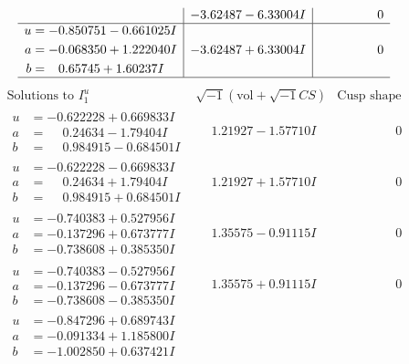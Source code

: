\documentclass[1p]{elsarticle_modified}
\theoremstyle{definition}
\newcommand{\I}{\sqrt{-1}}
\begin{document}
$$\begin{array}{c|c|c}
 & -3.62487 - 6.33004 I & \phantom{-0.000000 } 0 \\ \hline\begin{aligned}
u &= -0.850751 - 0.661025 I \\
a &= -0.068350 + 1.222040 I \\
b &= \phantom{-}0.65745 + 1.60237 I\end{aligned}
 & -3.62487 + 6.33004 I & \phantom{-0.000000 } 0\\
 \hline 
 \end{array}$$\newpage$$\begin{array}{c|c|c}  
\text{Solutions to }I^u_{1}& \I (\text{vol} + \sqrt{-1}CS) & \text{Cusp shape}\\
 \hline 
\begin{aligned}
u &= -0.622228 + 0.669833 I \\
a &= \phantom{-}0.24634 - 1.79404 I \\
b &= \phantom{-}0.984915 - 0.684501 I\end{aligned}
 & \phantom{-}1.21927 - 1.57710 I & \phantom{-0.000000 } 0 \\ \hline\begin{aligned}
u &= -0.622228 - 0.669833 I \\
a &= \phantom{-}0.24634 + 1.79404 I \\
b &= \phantom{-}0.984915 + 0.684501 I\end{aligned}
 & \phantom{-}1.21927 + 1.57710 I & \phantom{-0.000000 } 0 \\ \hline\begin{aligned}
u &= -0.740383 + 0.527956 I \\
a &= -0.137296 + 0.673777 I \\
b &= -0.738608 + 0.385350 I\end{aligned}
 & \phantom{-}1.35575 - 0.91115 I & \phantom{-0.000000 } 0 \\ \hline\begin{aligned}
u &= -0.740383 - 0.527956 I \\
a &= -0.137296 - 0.673777 I \\
b &= -0.738608 - 0.385350 I\end{aligned}
 & \phantom{-}1.35575 + 0.91115 I & \phantom{-0.000000 } 0 \\ \hline\begin{aligned}
u &= -0.847296 + 0.689743 I \\
a &= -0.091334 + 1.185800 I \\
b &= -1.002850 + 0.637421 I\end{aligned}

\end{array}$$
\end{document}
